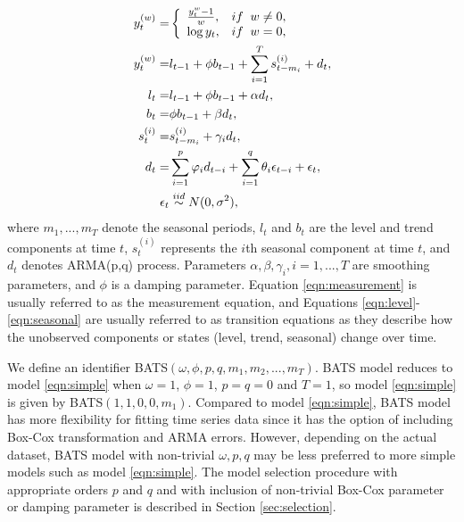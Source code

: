 \documentclass{uwstat572}
\begin{document}
\begin{subequations}
\begin{align}
y_t^{  (w)} = &\left\{
\begin{array}{l l}
\frac{y_t^{w}-1}{w}, & if \;\; w \neq 0,\\
\log y_t, & if\;\; w=0,\\
\end{array} \right. \\
y_t^{  (w)}=&l_{t-1}+\phi b_{t-1} +\sum\limits_{i=1}^T s_{t-m_i}^{(i)}+d_t, \label{eqn:measurement} \\
l_t=&l_{t-1}+\phi b_{t-1}+\alpha d_t,\label{eqn:level}  \\
 b_t=&\phi b_{t-1}+\beta d_t, \label{eqn:trend} \\
 s_t^{(i)}=&s_{t-m_i}^{(i)}+\gamma_i d_t, \label{eqn:seasonal} \\
 d_t=&\sum\limits_{i=1}^p \varphi_id_{t-i} +\sum\limits_{i=1}^q \theta_i \epsilon_{t-i}+\epsilon_t, \\
 \epsilon_t &  \stackrel{iid}{\sim} N(0,\sigma^2),
\end{align}
\end{subequations}
\noindent where $m_1,..., m_T$ denote the seasonal periods, $l_t$ and $b_t$ are the level and trend components at time $t$, $s_t^{(i)}$ represents the $i$th seasonal component at time $t$, and $d_t$ denotes ARMA(p,q) process. Parameters $\alpha, \beta, \gamma_i, i=1,...,T$ are smoothing parameters, and $\phi$ is a damping parameter. Equation \ref{eqn:measurement} is usually referred to as the measurement equation, and Equations \ref{eqn:level}-\ref{eqn:seasonal} are usually referred to as transition equations as they describe how the unobserved components or states (level, trend, seasonal) change over time. 

We define an identifier BATS$( \omega, \phi, p, q, m_1, m_2, ..., m_T )$. BATS model reduces to model \ref{eqn:simple} when $\omega=1$, $\phi=1$, $p=q=0$ and $T=1$, so model \ref{eqn:simple} is given by BATS$(1,1,0,0, m_1)$. Compared to model \ref{eqn:simple}, BATS model has more flexibility for fitting time series data since it has the option of including Box-Cox transformation and ARMA errors. However, depending on the actual dataset, BATS model with non-trivial $\omega, p, q$ may be less preferred to more simple models such as model \ref{eqn:simple}. The model selection procedure with appropriate orders $p$ and $q$ and with inclusion of non-trivial Box-Cox parameter or damping parameter is described in Section \ref{sec:selection}. 
\end{document}
